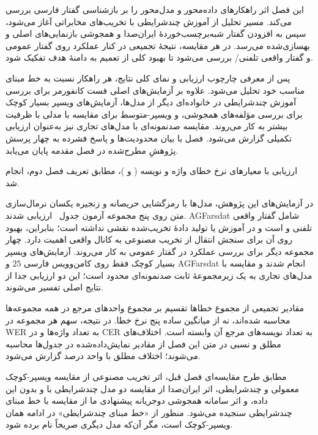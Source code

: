 
این فصل اثر راهکارهای داده‌محور و مدل‌محور را بر بازشناسی گفتار فارسی بررسی می‌کند. مسیر تحلیل از آموزش چندشرایطی با تخریب‌های مخابراتی آغاز می‌شود، سپس به افزودن گفتار شبه‌برچسب‌خوردهٔ ایران‌صدا و همجوشی بازنمایی‌های اصلی و بهسازی‌شده می‌رسد. در هر مقایسه، نتیجهٔ تجمیعی در کنار عملکرد روی گفتار عمومی و گفتار واقعی تلفنی/ بررسی می‌شود تا بهبود کلی از تعمیم به دامنهٔ هدف تفکیک شود.

پس از معرفی چارچوب ارزیابی و نمای کلی نتایج، هر راهکار نسبت به خط مبنای مناسب خود تحلیل می‌شود. علاوه بر آزمایش‌های اصلی فست کانفورمر برای بررسی آموزش چندشرایطی در خانواده‌ای دیگر از مدل‌ها، آزمایش‌های ویسپر بسیار کوچک برای بررسی مؤلفه‌های همجوشی، و ویسپر-متوسط برای مقایسه با مدلی با ظرفیت بیشتر به کار می‌روند. مقایسه صدنمونه‌ای با مدل‌های تجاری نیز به‌عنوان ارزیابی تکمیلی گزارش می‌شود. فصل با بیان محدودیت‌ها و پاسخ فشرده به چهار پرسش پژوهشِ مطرح‌شده در فصل مقدمه پایان می‌یابد.


ارزیابی با معیارهای نرخ خطای واژه و نویسه ( و )، مطابق تعریف فصل دوم، انجام شد.

در آزمایش‌های این پژوهش، مدل‌ها با رمزگشایی حریصانه و زنجیره یکسان نرمال‌سازی متن روی پنج مجموعه آزمون جدول~ ارزیابی شدند. AGFarsdat شامل گفتار واقعی تلفنی و  است و در آموزش یا تولید دادهٔ تخریب‌شده نقشی نداشته است؛ بنابراین، بهبود روی آن برای سنجش انتقال از تخریب مصنوعی به کانال واقعی اهمیت دارد. چهار مجموعه دیگر برای بررسی عملکرد در گفتار عمومی به کار می‌روند. آزمایش‌های ویسپر بسیار کوچک فقط روی کامن‌وویس فارسی $25$ و AGFarsdat انجام شدند و مقایسه با مدل‌های تجاری به یک زیرمجموعهٔ ثابت صدنمونه‌ای محدود است؛ این دو ارزیابی جدا از نتایج اصلی تفسیر می‌شوند.

مقادیر تجمیعی از مجموع خطاها تقسیم بر مجموع واحدهای مرجع در همه مجموعه‌ها محاسبه شده‌اند، نه از میانگین ساده پنج نرخ خطا. در نتیجه، سهم هر مجموعه در WER به تعداد واژه‌ها و در CER به تعداد نویسه‌های مرجع آن وابسته است. اختلاف‌های مطلق و نسبی در متن این فصل از مقادیر نمایش‌داده‌شده در جدول‌ها محاسبه می‌شوند؛ اختلاف مطلق با واحد درصد گزارش می‌شود.

مطابق طرح مقایسه‌ای فصل قبل، اثر تخریب مصنوعی از مقایسه ویسپر-کوچک معمولی و چندشرایطی، اثر ایران‌صدا از مقایسه دو مدل چندشرایطی با و بدون این داده، و اثر سامانه همجوشی دوجریانه پیشنهادی ما از مقایسه با خط مبنای چندشرایطی سنجیده می‌شود. منظور از «خط مبنای چندشرایطی» در ادامه همان ویسپر-کوچک است، مگر آن‌که مدل دیگری صریحاً نام برده شود.

